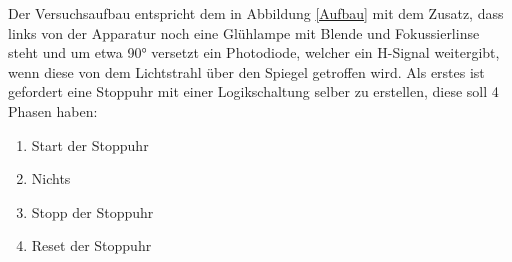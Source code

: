     Der Versuchsaufbau entspricht dem in Abbildung \ref{Aufbau} mit dem Zusatz, dass links von der Apparatur 
    noch eine Glühlampe mit Blende und Fokussierlinse steht und um etwa 90° versetzt ein 
    Photodiode, welcher ein H-Signal weitergibt, wenn diese von dem Lichtstrahl über den Spiegel 
    getroffen wird.
    Als erstes ist gefordert eine Stoppuhr mit einer Logikschaltung selber zu erstellen, diese soll 4 
    Phasen haben:
    
    \begin{enumerate}
      \item{Start der Stoppuhr} 
      \item{\glqq Nichts\grqq\ } 
      \item{Stopp der Stoppuhr} 
      \item{Reset der Stoppuhr} 
    \end{enumerate}

